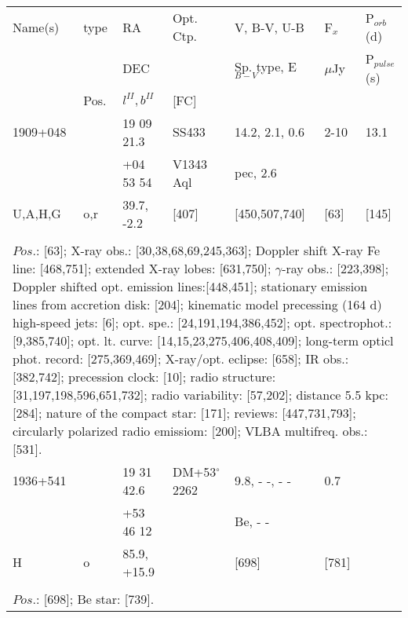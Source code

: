 \documentclass{aa}
\begin{document}
\clearpage\begin{table*}[h]
\begin{tabular}{p{2.5cm}p{1cm}p{1.8cm}p{2.3cm}p{3.3cm}p{2.0cm}p{2.2cm}}
\noalign{\smallskip}
\multicolumn{7}{p{17.5cm}}{Table 1.  (continued) }\\        
\hline
\noalign{\smallskip}
Name(s)      & type  & RA                  &  Opt. Ctp. & V, B-V, U-B                    &   F$_{x}$           & P$_{orb}$(d)    \\
                      &            &  DEC              &                     &  Sp. type, E$_{B-V}$  &    $\mu$Jy & P$_{pulse}$(s) \\
                      & Pos.  &  $l^{II}, b^{II}$     &  [FC]           &                                          &                            &                             \\
\noalign{\smallskip} 
\hline
\noalign{\smallskip}
 1909+048     &           & 19 09 21.3      & SS433              & 14.2, 2.1, 0.6       &  2-10             & 13.1     \\
                        &           & +04 53 54       &  V1343 Aql      & pec, 2.6               &                       &             \\
U,A,H,G         &  o,r    & 39.7, -2.2        &     [407]             & [450,507,740]   &        [63]        &  [145]  \\
\\
\multicolumn{7}{p{17.5cm}}{
$Pos$.: [63]; X-ray obs.: [30,38,68,69,245,363]; Doppler shift X-ray Fe line: [468,751]; extended X-ray lobes: 
[631,750]; $\gamma$-ray obs.: [223,398]; Doppler shifted opt. emission lines:[448,451]; stationary emission 
lines from accretion disk: [204]; kinematic model precessing (164 d) high-speed jets: [6]; opt. spe.: 
[24,191,194,386,452]; opt. spectrophot.: [9,385,740]; opt. lt. curve: [14,15,23,275,406,408,409]; 
long-term opticl phot. record: [275,369,469]; X-ray/opt. eclipse: [658]; IR obs.: [382,742]; precession 
clock: [10]; radio structure: [31,197,198,596,651,732]; radio variability: [57,202]; distance 5.5 kpc: [284]; 
nature of the compact star: [171]; reviews: [447,731,793]; circularly polarized radio emissiom: [200];
VLBA multifreq. obs.: [531].  }\\

\noalign{\smallskip}
\hline
\noalign{\smallskip}
 1936+541     &          & 19 31 42.6     &  DM+53$^\circ$2262    &  9.8, - -, - -          & 0.7             &                        \\
                       &           & +53 46 12       &                                          &  Be, - -               &                   &          \\
H                   & o         & 85.9, +15.9     &                                          &  [698]              & [781]       &           \\
\\
\multicolumn{7}{p{17.5cm}}{
$Pos$.: [698]; Be star: [739].}\\


\end{tabular}
\end{table*}
\end{document}
